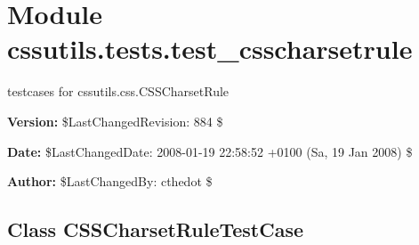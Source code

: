 %
%
%


\section{Module cssutils.tests.test\_csscharsetrule}

    \label{cssutils:tests:test_csscharsetrule}
testcases for cssutils.css.CSSCharsetRule

\textbf{Version:} \$LastChangedRevision: 884 \$



\textbf{Date:} \$LastChangedDate: 2008-01-19 22:58:52 +0100 (Sa, 19 Jan 2008) \$



\textbf{Author:} \$LastChangedBy: cthedot \$





\subsection{Class CSSCharsetRuleTestCase}


